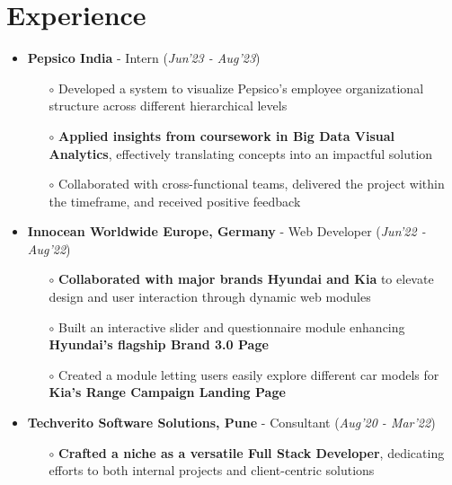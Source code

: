 \documentclass[10.8pt, a4paper]{extarticle}
\newcommand{\shorterSection}[1]{\vspace{-10pt}\section{#1}}
\begin{document}
\shorterSection{Experience}
\vspace{-2pt}
\begin{itemize}
    \item \textbf{Pepsico India} - Intern
    \hfill\hfill(\textit{Jun'23 - Aug'23})
    \begin{itemize}
          \item[$\circ$] Developed a system to visualize Pepsico's employee organizational structure across different hierarchical levels\\[-0.6cm]
          \item[$\circ$] \textbf{Applied insights from coursework in Big Data Visual Analytics}, effectively translating concepts into an impactful solution\\[-0.6cm]
          \item[$\circ$] Collaborated with cross-functional teams, delivered the project within the timeframe, and received positive feedback\\[-0.6cm]
    \end{itemize}
    \vspace{0.055cm}
    \item \textbf{Innocean Worldwide Europe, Germany} - Web Developer
    \hfill\hfill(\textit{Jun'22 - Aug'22})
    \begin{itemize}
          \item[$\circ$] \textbf{Collaborated with major brands Hyundai and Kia} to elevate design and user interaction through dynamic web modules \\[-0.6cm]
          \item[$\circ$] Built an interactive slider and questionnaire module enhancing \textbf{Hyundai's flagship Brand 3.0 Page}\\[-0.6cm]
          \item[$\circ$] Created a module letting users easily explore different car models for \textbf{Kia's Range Campaign Landing Page}\\[-0.6cm]
    \end{itemize}
    \vspace{0.055cm}
    \item \textbf{Techverito Software Solutions, Pune} - Consultant
    \hfill\hfill(\textit{Aug'20 - Mar'22})
    \begin{itemize}
          \item[$\circ$] \textbf{Crafted a niche as a versatile Full Stack Developer}, dedicating efforts to both internal projects and client-centric solutions \\[-0.6cm]

\end{itemize}
\end{itemize}
\end{document}
